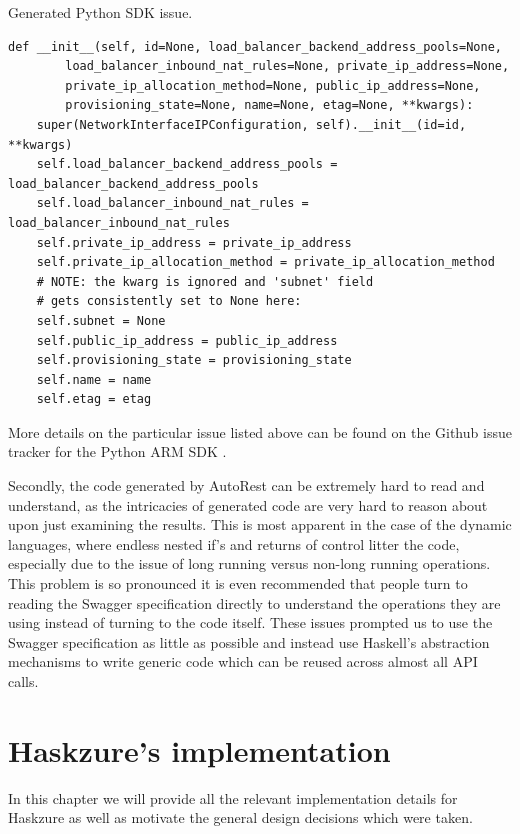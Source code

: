 \documentclass[11pt]{report}
\begin{document}
\begin{listing}[H]
\caption{Generated Python SDK issue.}
\label{listing:pythonLibraryFailure}
\begin{verbatim}
def __init__(self, id=None, load_balancer_backend_address_pools=None,
        load_balancer_inbound_nat_rules=None, private_ip_address=None,
        private_ip_allocation_method=None, public_ip_address=None,
        provisioning_state=None, name=None, etag=None, **kwargs):
    super(NetworkInterfaceIPConfiguration, self).__init__(id=id, **kwargs)
    self.load_balancer_backend_address_pools = load_balancer_backend_address_pools
    self.load_balancer_inbound_nat_rules = load_balancer_inbound_nat_rules
    self.private_ip_address = private_ip_address
    self.private_ip_allocation_method = private_ip_allocation_method
    # NOTE: the kwarg is ignored and 'subnet' field
    # gets consistently set to None here:
    self.subnet = None
    self.public_ip_address = public_ip_address
    self.provisioning_state = provisioning_state
    self.name = name
    self.etag = etag
\end{verbatim}
\end{listing}

More details on the particular issue listed above can be found on the Github
issue tracker for the Python ARM SDK \cite{pythonSDKIssue}.

Secondly, the code generated by AutoRest can be extremely hard to read and
understand, as the intricacies of generated code are very hard to reason about
upon just examining the results. This is most apparent in the case of the
dynamic languages, where endless nested if's and returns of control litter the
code, especially due to the issue of long running versus non-long running
operations. This problem is so pronounced it is even recommended that people
turn to reading the Swagger specification directly to understand the operations
they are using instead of turning to the code itself. \newline
These issues prompted us to use the Swagger specification as
little as possible and instead use Haskell's abstraction mechanisms to write
generic code which can be reused across almost all API calls.


\chapter{Haskzure's implementation}

In this chapter we will provide all the relevant implementation details for
Haskzure as well as motivate the general design decisions which were taken.
\end{document}
